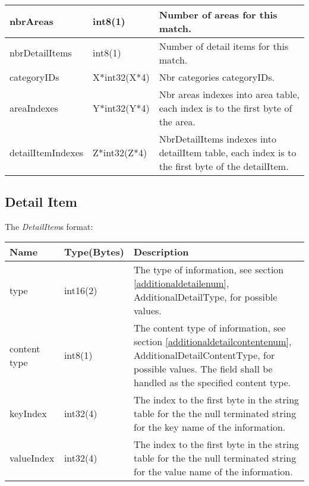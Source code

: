 \documentclass[a4paper]{article}
\begin{document}
\ \\
\begin{tabular}{|l|l|p{60mm}|} %
  \hline
  nbrAreas & int8(1)    & Number of areas for this match. \\\hline
  nbrDetailItems & int8(1)  & Number of detail items for this match. \\\hline
  categoryIDs  & X*int32(X*4) & Nbr categories categoryIDs. \\\hline
  areaIndexes & Y*int32(Y*4) & Nbr areas indexes into area table,
                                 each index is to the first byte of the 
                                 area. \\\hline
  detailItemIndexes & Z*int32(Z*4) & NbrDetailItems indexes into detailItem table,
                                   each index is to the first byte of the 
                                   detailItem. \\\hline
\end{tabular}


\subsection{Detail Item}
\label{DetailItem}

The \emph{DetailItem}s format: \\
\begin{tabular}{|l|l|p{70mm}|}
  \hline
  \textbf{Name} & \textbf{Type(Bytes)} & \textbf{Description} \\\hline
  type      & int16(2)     & The type of information, see section
                            \ref{additionaldetailenum}, AdditionalDetailType, 
                            for possible values.
                            \\\hline
  content type & int8(1)   & The content type of information, see section 
                             \ref{additionaldetailcontentenum}, 
                             AdditionalDetailContentType, 
                             for possible values. The field shall be handled 
                             as the specified content type.
                             \\\hline
  keyIndex  & int32(4)     & The index to the first byte in the string 
                            table for the the null terminated string for the 
                            key name of the information. \\\hline

  valueIndex & int32(4)    & The index to the first byte in the string 
                             table for the the null terminated string for
                             the value name of the information.
                             \\\hline
\end{tabular}
\end{document}
